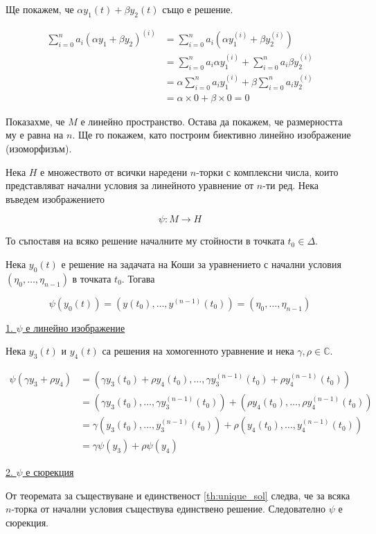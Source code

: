 \documentclass{scrartcl}
\begin{document}
\begin{FlushLeft}
Ще покажем, че $\alpha y_1(t) + \beta y_2(t)$ също е решение.

\begin{align*}
    \sum_{i=0}^n a_i(\alpha y_1 + \beta y_2)^{(i)} & = \sum_{i=0}^n a_i(\alpha y_1^{(i)} + \beta y_2^{(i)})\\
    & = \sum_{i=0}^n a_i\alpha y_1^{(i)} + \sum_{i=0}^n a_i \beta y_2^{(i)}\\
    & = \alpha \sum_{i=0}^n a_i y_1^{(i)} + \beta \sum_{i=0}^n a_i y_2^{(i)}\\
    & = \alpha \times 0 + \beta \times 0 = 0
\end{align*}

Показахме, че $M$ е линейно пространство. Остава да покажем, че размерността му е равна на $n$. Ще го покажем, като построим биективно линейно изображение (изоморфизъм).

Нека $H$ е множеството от всички наредени $n$-торки с комплексни числа, които представляват начални условия за линейното уравнение от $n$-ти ред. Нека въведем изображението

$$\psi: M \to H$$

То съпоставя на всяко решение началните му стойности в точката $t_0 \in \Delta$.

Нека $y_0(t)$ е решение на задачата на Коши за уравнението с начални условия $(\eta_0, \dots, \eta_{n-1})$ в точката $t_0$. Тогава

$$\psi(y_0(t)) = (y(t_0), \dots, y^{(n-1)}(t_0)) = (\eta_0, \dots, \eta_{n-1})$$

\underline{1. $\psi$ е линейно изображение}

Нека $y_3(t)$ и $y_4(t)$ са решения на хомогенното уравнение и нека $\gamma, \rho \in \mathbb{C}$.

\begin{align*}
    \psi(\gamma y_3 + \rho y_4) & = (\gamma y_3(t_0) + \rho y_4(t_0), \dots, \gamma y_3^{(n-1)}(t_0) + \rho y_4^{(n-1)}(t_0))\\
    & = (\gamma y_3(t_0), \dots, \gamma y_3^{(n-1)}(t_0)) + (\rho y_4(t_0), \dots, \rho y_4^{(n-1)}(t_0))\\
    & = \gamma(y_3(t_0), \dots, y_3^{(n-1)}(t_0)) + \rho (y_4(t_0), \dots, y_4^{(n-1)}(t_0))\\
    & = \gamma \psi(y_3) + \rho \psi(y_4)
\end{align*}

\underline{2. $\psi$ е сюрекция}

От теоремата за съществуване и единственост \ref{th:unique_sol} следва, че за всяка $n$-торка от начални условия съществува единствено решение. Следователно $\psi$ е сюрекция.


\end{FlushLeft}
\end{document}
